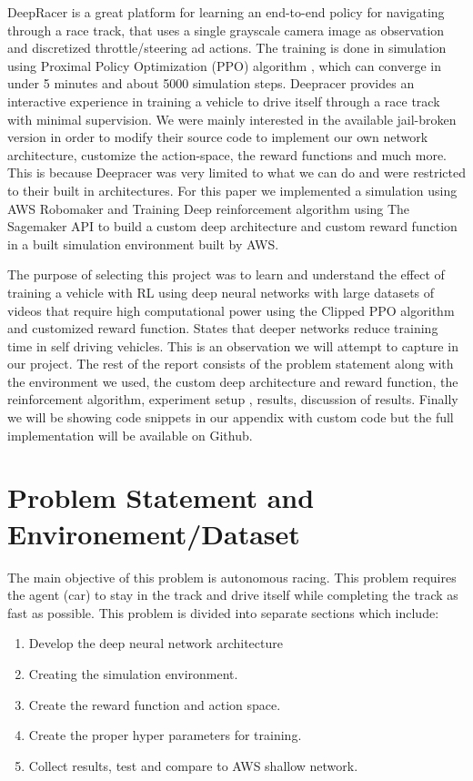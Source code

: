 \documentclass[journal]{IEEEtran}
\begin{document}
DeepRacer is a great platform for learning an end-to-end policy for navigating through a race track, that uses a single grayscale camera image as observation and discretized throttle/steering ad actions. The training is done in simulation using Proximal Policy Optimization (PPO) algorithm \cite{schulman2017proximal}, which can converge in under 5 minutes and about 5000 simulation steps. Deepracer provides an interactive experience in training a vehicle to drive itself through a race track with minimal supervision. We were mainly interested in the available jail-broken version in order to modify their source code to implement our own network architecture, customize the action-space, the reward functions and much more.  This is because Deepracer was very limited to what we can do and were restricted to their built in architectures. For this paper we implemented a simulation using AWS Robomaker and Training Deep reinforcement algorithm using The Sagemaker API to build a custom deep architecture and custom reward function in a built simulation environment built by AWS.  

The purpose of selecting this project was to learn and understand the effect of training a vehicle with RL using deep neural networks with large datasets of videos that require high computational power using the Clipped PPO algorithm and customized reward function.  \cite{7830823} States that deeper networks reduce training time in self driving vehicles.  This is an observation we will attempt to capture in our project.  The rest of the report consists of the problem statement along with the environment we used, the custom deep architecture and reward function, the reinforcement algorithm, experiment setup , results, discussion of results.  Finally we will be showing code snippets in our appendix with custom code but the full implementation will be available on Github.


\section{Problem Statement and Environement/Dataset}
The main objective of this problem is autonomous racing.  This problem requires the agent (car) to stay in the track and drive itself while completing the track as fast as possible.  This problem is divided into separate sections which include:

\begin{enumerate}
  \item Develop the deep neural network architecture
  \item Creating the simulation environment.
  \item Create the reward function and action space.
  \item Create the proper hyper parameters for training.
  \item Collect results, test and compare to AWS shallow network.
\end{enumerate}
\end{document}

